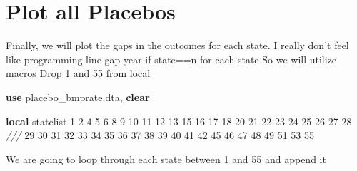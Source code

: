 \documentclass[
]{book}
\newenvironment{Shaded}{\begin{snugshade}}{\end{snugshade}}
\newcommand{\CommentTok}[1]{\textcolor[rgb]{0.56,0.35,0.01}{\textit{#1}}}
\newcommand{\KeywordTok}[1]{\textcolor[rgb]{0.13,0.29,0.53}{\textbf{#1}}}
\newcommand{\NormalTok}[1]{#1}
\begin{document}
\section{Plot all Placebos}\label{plot-all-placebos}

Finally, we will plot the gaps in the outcomes for each state.
I really don't feel like programming line gap year if state==n for each state
So we will utilize macros
Drop 1 and 55 from local

\begin{Shaded}
\begin{Highlighting}[]
\KeywordTok{use}\NormalTok{ placebo\_bmprate.dta, }\KeywordTok{clear}

\KeywordTok{local}\NormalTok{ statelist  1 2 4 5 6 8 9 10 11 12 13 15 16 17 18 20 21 22 23 24 25 26 27 28 }\CommentTok{///}
\NormalTok{                 29 30 31 32 33 34 35 36 37 38 39 40 41 42 45 46 47 48 49 51 53 55}
\end{Highlighting}
\end{Shaded}

We are going to loop through each state between 1 and 55 and append it
\end{document}
